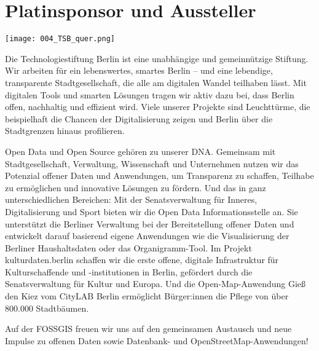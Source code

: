 \section*{Platinsponsor und Aussteller}

\vspace{-0.5cm}
\centerline{\texttt{[image: 004\_TSB\_quer.png]}}
\small
Die Technologiestiftung Berlin ist eine unabhängige und gemeinnützige Stiftung. Wir arbeiten für ein lebenswertes, smartes Berlin – und eine lebendige, transparente Stadtgesellschaft, die alle am digitalen Wandel teilhaben lässt. Mit digitalen Tools und smarten Lösungen tragen wir aktiv dazu bei, dass Berlin offen, nachhaltig und effizient wird. Viele unserer Projekte sind Leuchttürme, die beispielhaft die Chancen der Digitalisierung zeigen und Berlin über die Stadtgrenzen hinaus profilieren.

Open Data und Open Source gehören zu unserer DNA. Gemeinsam mit Stadtgesellschaft, Verwaltung, Wissenschaft und Unternehmen nutzen wir das Potenzial offener Daten und Anwendungen, um Transparenz zu schaffen, Teilhabe zu ermöglichen und innovative Lösungen zu fördern. Und das in ganz unterschiedlichen Bereichen: Mit der Senatsverwaltung für Inneres, Digitalisierung und Sport bieten wir die Open Data Informationsstelle an. Sie unterstützt die Berliner Verwaltung bei der Bereitstellung offener Daten und entwickelt darauf basierend eigene Anwendungen wie die Visualisierung der Berliner Haushaltsdaten oder das Organigramm-Tool. Im Projekt kulturdaten.berlin schaffen wir die erste offene, digitale Infrastruktur für Kulturschaffende und -institutionen in Berlin, gefördert durch die Senatsverwaltung für Kultur und Europa. Und die Open-Map-Anwendung Gieß den Kiez vom CityLAB Berlin ermöglicht Bürger:innen die Pflege von über 800.000 Stadtbäumen.

Auf der FOSSGIS freuen wir uns auf den gemeinsamen Austausch und neue Impulse zu offenen Daten sowie Datenbank- und OpenStreetMap-Anwendungen!
\normalsize
